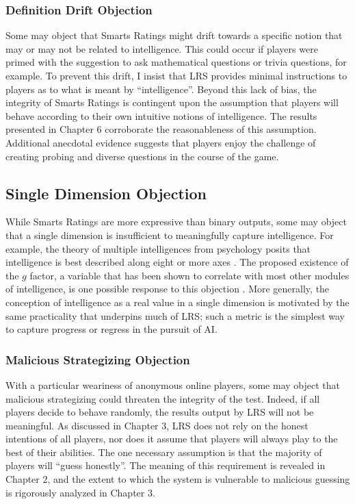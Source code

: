 \subsubsection{Definition Drift Objection}

Some may object that Smarts Ratings might drift towards a specific notion that may or may not be related to intelligence. This could occur if players were primed with the suggestion to ask mathematical questions or trivia questions, for example. To prevent this drift, I insist that LRS provides minimal instructions to players as to what is meant by ``intelligence''. Beyond this lack of bias, the integrity of Smarts Ratings is contingent upon the assumption that players will behave according to their own intuitive notions of intelligence. The results presented in Chapter $6$ corroborate the reasonableness of this assumption. Additional anecdotal evidence suggests that players enjoy the challenge of creating probing and diverse questions in the course of the game.

\subsection{Single Dimension Objection}

While Smarts Ratings are more expressive than binary outputs, some may object that a single dimension is insufficient to meaningfully capture intelligence. For example, the theory of multiple intelligences from psychology posits that intelligence is best described along eight or more axes \citep{gardner2011frames}. The proposed existence of the $g$ factor, a variable that has been shown to correlate with most other modules of intelligence, is one possible response to this objection \citep{visser2006g}. More generally, the conception of intelligence as a real value in a single dimension is motivated by the same practicality that underpins much of LRS; such a metric is the simplest way to capture progress or regress in the pursuit of AI.

\subsubsection{Malicious Strategizing Objection}

With a particular weariness of anonymous online players, some may object that malicious strategizing could threaten the integrity of the test. Indeed, if all players decide to behave randomly, the results output by LRS will not be meaningful. As discussed in Chapter $3$, LRS does not rely on the honest intentions of all players, nor does it assume that players will always play to the best of their abilities. The one necessary assumption is that the majority of players will ``guess honestly''. The meaning of this requirement is revealed in Chapter $2$, and the extent to which the system is vulnerable to malicious guessing is rigorously analyzed in Chapter $3$.

